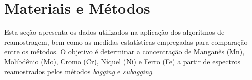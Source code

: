 \chapter{Materiais e Métodos}
\label{cha:metresult}



Esta seção apresenta os dados utilizados na aplicação dos algoritmos 
de reamostragem, bem como as medidas estatísticas empregadas para 
comparação entre os métodos. O objetivo é determinar a concentração 
de Manganês (Mn), Molibdênio (Mo), Cromo (Cr), Níquel (Ni) e Ferro 
(Fe) a partir de espectros reamostrados pelos métodos \textit{bagging} 
e \textit{subagging}.

